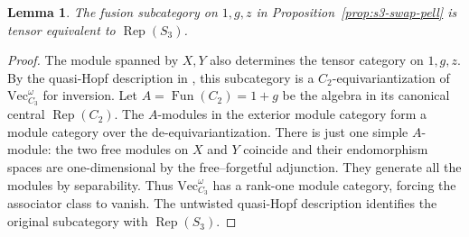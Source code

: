 \documentclass[11pt,a4paper]{article}
\newtheorem{lemma}[theorem]{Lemma}
\numberwithin{equation}{section}
\begin{document}
\begin{lemma}\label{lem:actual-s3}The fusion subcategory on $1,g,z$ in Proposition~\ref{prop:s3-swap-pell} is tensor equivalent to $\operatorname{Rep}(S_3)$.\end{lemma}
\begin{proof}
The module spanned by $X,Y$ also determines the tensor category on
$1,g,z$. By the quasi-Hopf description in \cite[Theorem~7.1]{EGO}, this subcategory is a $C_2$-equivariantization of
$\mathrm{Vec}_{C_3}^{\omega}$ for inversion.
Let $A=\operatorname{Fun}(C_2)=1+g$ be the algebra in its canonical
central $\operatorname{Rep}(C_2)$. The $A$-modules in the exterior
module category form a module category over the de-equivariantization.
There is just one simple $A$-module: the two free modules on $X$
and $Y$ coincide and their endomorphism spaces are one-dimensional
by the free--forgetful adjunction. They generate all the modules by
separability. Thus $\mathrm{Vec}_{C_3}^{\omega}$ has a rank-one
module category, forcing the associator class to vanish. The
untwisted quasi-Hopf description identifies the original subcategory
with $\operatorname{Rep}(S_3)$.

\end{proof}
\end{document}
